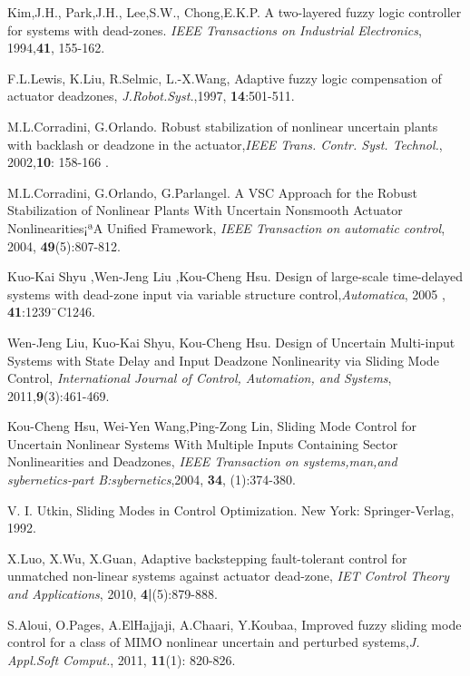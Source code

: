 \documentclass[journal,onecolumn]{IEEEtran}
\begin{document}
\begin{thebibliography}{99}
Kim,J.H., Park,J.H., Lee,S.W., Chong,E.K.P. A two-layered fuzzy
logic controller for systems with dead-zones. {\sl IEEE Transactions
on Industrial Electronics}, 1994,{\bf 41}, 155-162.

F.L.Lewis, K.Liu, R.Selmic,  L.-X.Wang, Adaptive fuzzy logic
compensation of actuator deadzones, {\sl J.Robot.Syst.},1997, {\bf
14}:501-511.



M.L.Corradini, G.Orlando. Robust stabilization of nonlinear
uncertain plants with backlash or deadzone in the actuator,{\sl IEEE
Trans. Contr. Syst. Technol.}, 2002,{\bf 10}: 158-166 .

M.L.Corradini, G.Orlando, G.Parlangel. A VSC Approach for the Robust
Stabilization of Nonlinear Plants With Uncertain Nonsmooth Actuator
Nonlinearities¡ªA Unified Framework, {\sl IEEE Transaction on
automatic control}, 2004, {\bf 49}(5):807-812.



Kuo-Kai Shyu ,Wen-Jeng Liu ,Kou-Cheng Hsu. Design of large-scale
time-delayed systems with dead-zone input via variable structure
control,{\sl Automatica}, 2005 , {\bf41}:1239¨C1246.

Wen-Jeng Liu, Kuo-Kai Shyu,  Kou-Cheng Hsu. Design of Uncertain
Multi-input Systems with State Delay and Input Deadzone Nonlinearity
via Sliding Mode Control, {\sl International Journal of Control,
Automation, and Systems}, 2011,{\bf 9}(3):461-469.

Kou-Cheng Hsu, Wei-Yen Wang,Ping-Zong Lin, Sliding Mode Control for
Uncertain Nonlinear Systems With Multiple Inputs Containing Sector
Nonlinearities and Deadzones, {\sl IEEE Transaction on
systems,man,and sybernetics-part B:sybernetics},2004, {\bf 34},
(1):374-380.

V. I. Utkin, Sliding Modes in Control Optimization. New York:
Springer-Verlag, 1992.

X.Luo, X.Wu, X.Guan, Adaptive backstepping fault-tolerant control
for unmatched non-linear systems against actuator dead-zone, {\sl
IET Control Theory and Applications}, 2010, {\bf 4|}(5):879-888.




S.Aloui, O.Pages, A.ElHajjaji, A.Chaari, Y.Koubaa, Improved fuzzy
sliding mode control for a class of MIMO nonlinear uncertain and
perturbed systems,{\sl J. Appl.Soft Comput.}, 2011, {\bf 11}(1):
820-826.


\end{thebibliography}
\end{document}
